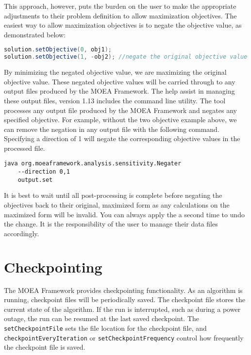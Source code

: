 This approach, however, puts the burden on the user to make the appropriate adjustments to their problem definition to allow maximization objectives.  The easiest way to allow maximization objectives is to negate the objective value, as demonstrated below:

\begin{lstlisting}[language=Java]
solution.setObjective(0, obj1);
solution.setObjective(1, -obj2); //negate the original objective value
\end{lstlisting}

By minimizing the negated objective value, we are maximizing the original objective value.  These negated objective values will be carried through to any output files produced by the MOEA Framework.  The help assist in managing these output files, version 1.13 includes the  command line utility.  The  tool processes any output file produced by the MOEA Framework and negates any specified objective.  For example, without the two objective example above, we can remove the negation in any output file with the following command.  Specifying a direction of 1 will negate the corresponding objective values in the processed file.

\begin{lstlisting}[language=Plaintext]
java org.moeaframework.analysis.sensitivity.Negater
    --direction 0,1
    output.set
\end{lstlisting}

\begin{important}
It is best to wait until all post-processing is complete before negating the objectives back to their original, maximized form as any calculations on the maximized form will be invalid.  You can always apply the  a second time to undo the change.  It is the responsibility of the user to manage their data files accordingly.
\end{important}


\section{Checkpointing}

The MOEA Framework provides checkpointing functionality.  As an algorithm is running, checkpoint files will be periodically saved.  The checkpoint file stores the current state of the algorithm.  If the run is interrupted, such as during a power outage, the run can be resumed at the last saved checkpoint.  The \texttt{setCheckpointFile} sets the file location for the checkpoint file, and \texttt{checkpointEveryIteration} or \texttt{setCheckpointFrequency} control how frequently the checkpoint file is saved.

